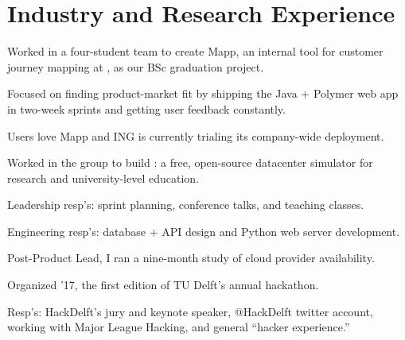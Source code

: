 \documentclass[]{deedy-resume-openfont}
\begin{document}
\hfill
\begin{minipage}[t]{0.66\textwidth} 


\section{Industry and Research Experience}

\vspace{\topsep}
\begin{tightemize}
    \item Worked in a four-student team to create Mapp, an internal tool for customer journey mapping at \href{https://www.ing.com/}{}, as our BSc graduation project.
    \item Focused on finding product-market fit by shipping the Java + Polymer web app in two-week sprints and getting user feedback constantly.
    \item Users love Mapp and ING is currently trialing its company-wide deployment.
\end{tightemize}
\vspace{0.5\topsep}

\begin{tightemize}
    \item Worked in the \href{https://atlarge-research.com/}{} group to build \href{https://opendc.org}{}: a free, open-source datacenter simulator for research and university-level education.
    \item Leadership resp's: sprint planning, conference talks, and teaching classes.
    \item Engineering resp's: database + API design and Python web server development.
    \item Post-Product Lead, I ran a nine-month study of cloud provider availability.
\end{tightemize}
\vspace{0.5\topsep}

\begin{tightemize}
    \item Organized \href{https://2017.hackdelft.nl/}{} '17, the first edition of TU Delft's annual hackathon.
    \item Resp's: HackDelft’s jury and keynote speaker, @HackDelft twitter account, working with Major League Hacking, and general ``hacker experience.''
\end{tightemize}
\vspace{0.5\topsep}


\end{minipage}
\end{document}
